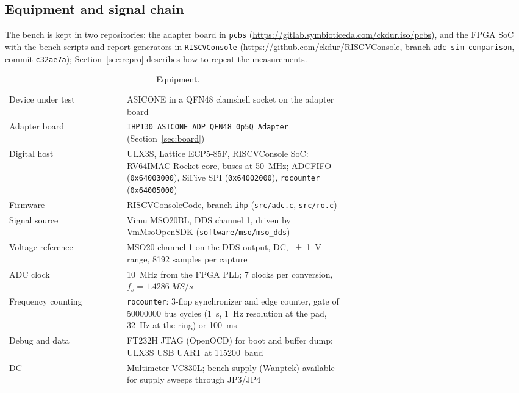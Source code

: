 \documentclass[10pt,a4paper]{article}
\begin{document}
\subsection{Equipment and signal chain}
The bench is kept in two repositories: the adapter board in \texttt{pcbs}
(\url{https://gitlab.symbioticeda.com/ckdur.iso/pcbs}), and the FPGA SoC with the bench scripts and
report generators in \texttt{RISCVConsole} (\url{https://github.com/ckdur/RISCVConsole}, branch
\texttt{adc-sim-comparison}, commit \texttt{c32ae7a}); Section~\ref{sec:repro} describes how to repeat the
measurements.
\begin{table}[H]\centering\small
\begin{tabular}{lp{0.66\linewidth}}
\toprule
Device under test & ASICONE in a QFN48 clamshell socket on the adapter board \\
Adapter board & \texttt{IHP130\_ASICONE\_ADP\_QFN48\_0p5Q\_Adapter} (Section~\ref{sec:board}) \\
Digital host & ULX3S, Lattice ECP5-85F, RISCVConsole SoC: RV64IMAC Rocket core, buses at \SI{50}{MHz};
  ADCFIFO (\texttt{0x64003000}), SiFive SPI (\texttt{0x64002000}), \texttt{rocounter} (\texttt{0x64005000}) \\
Firmware & RISCVConsoleCode, branch \texttt{ihp} (\texttt{src/adc.c}, \texttt{src/ro.c}) \\
Signal source & Vimu MSO20BL, DDS channel 1, driven by VmMsoOpenSDK (\nolinkurl{software/mso/mso_dds}) \\
Voltage reference & MSO20 channel 1 on the DDS output, DC, \SI{\pm 1}{V} range, 8192 samples per capture \\
ADC clock & \SI{10}{MHz} from the FPGA PLL; 7 clocks per conversion, $f_s = \SI{1.4286}{MS/s}$ \\
Frequency counting & \texttt{rocounter}: 3-flop synchronizer and edge counter, gate of \num{50000000}
  bus cycles (\SI{1}{s}, \SI{1}{Hz} resolution at the pad, \SI{32}{Hz} at the ring) or \SI{100}{ms} \\
Debug and data & FT232H JTAG (OpenOCD) for boot and buffer dump; ULX3S USB UART at \SI{115200}{baud} \\
DC & Multimeter VC830L; bench supply (Wanptek) available for supply sweeps through JP3/JP4 \\
\bottomrule
\end{tabular}
\caption{Equipment.}
\end{table}
\end{document}
